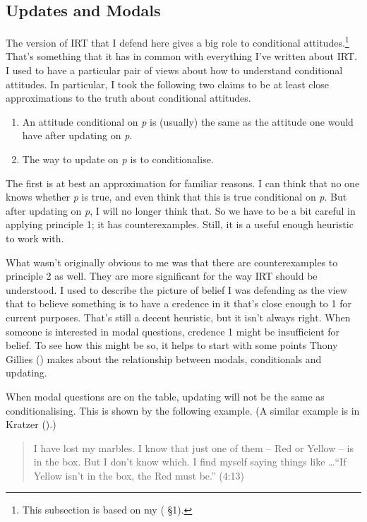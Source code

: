 \documentclass[
  10pt,
  letterpaper,
  twoside]{scrbook}
\providecommand{\tightlist}{%
  \setlength{\itemsep}{0pt}\setlength{\parskip}{0pt}}\usepackage{longtable,booktabs,array}
\begin{document}
\subsection{Updates and Modals}\label{sec-modalupdate}

The version of IRT that I defend here gives a big role to conditional
attitudes.\footnote{This subsection is based on my
  ( §1).} That's something that it
has in common with everything I've written about IRT. I used to have a
particular pair of views about how to understand conditional attitudes.
In particular, I took the following two claims to be at least close
approximations to the truth about conditional attitudes.

\begin{enumerate}
\def\labelenumi{\arabic{enumi}.}
\tightlist
\item
  An attitude conditional on \emph{p} is (usually) the same as the
  attitude one would have after updating on \emph{p}.
\item
  The way to update on \emph{p} is to conditionalise.
\end{enumerate}

The first is at best an approximation for familiar reasons. I can think
that no one knows whether \emph{p} is true, and even think that this is
true conditional on \emph{p}. But after updating on \emph{p}, I will no
longer think that. So we have to be a bit careful in applying principle
1; it has counterexamples. Still, it is a useful enough heuristic to
work with.

What wasn't originally obvious to me was that there are counterexamples
to principle 2 as well. They are more significant for the way IRT should
be understood. I used to describe the picture of belief I was defending
as the view that to believe something is to have a credence in it that's
close enough to 1 for current purposes. That's still a decent heuristic,
but it isn't always right. When someone is interested in modal
questions, credence 1 might be insufficient for belief. To see how this
might be so, it helps to start with some points Thony Gillies
() makes about the relationship between
modals, conditionals and updating.

When modal questions are on the table, updating will not be the same as
conditionalising. This is shown by the following example. (A similar
example is in Kratzer ().)

\begin{quote}
I have lost my marbles. I know that just one of them -- Red or Yellow --
is in the box. But I don't know which. I find myself saying things like
\ldots{}``If Yellow isn't in the box, the Red must be.'' (4:13)
\end{quote}
\end{document}
